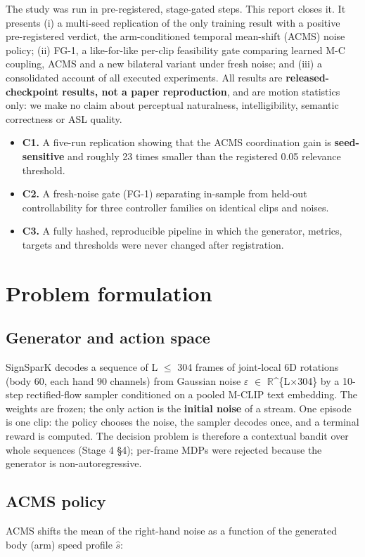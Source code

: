 \documentclass[conference]{IEEEtran}
\begin{document}
The study was run in pre-registered, stage-gated steps. This report closes it. It presents (i) a multi-seed replication of the only training result with a positive pre-registered verdict, the arm-conditioned temporal mean-shift (ACMS) noise policy; (ii) FG-1, a like-for-like per-clip feasibility gate comparing learned M-C coupling, ACMS and a new bilateral variant under fresh noise; and (iii) a consolidated account of all executed experiments. All results are \textbf{released-checkpoint results, not a paper reproduction}, and are motion statistics only: we make no claim about perceptual naturalness, intelligibility, semantic correctness or ASL quality.

\begin{itemize}\item \textbf{C1.} A five-run replication showing that the ACMS coordination gain is \textbf{seed-sensitive} and roughly 23 times smaller than the registered 0.05 relevance threshold.\item \textbf{C2.} A fresh-noise gate (FG-1) separating in-sample from held-out controllability for three controller families on identical clips and noises.\item \textbf{C3.} A fully hashed, reproducible pipeline in which the generator, metrics, targets and thresholds were never changed after registration.\end{itemize}
\section{Problem formulation}
\subsection{Generator and action space}
SignSparK decodes a sequence of L $\leq$ 304 frames of joint-local 6D rotations (body 60, each hand 90 channels) from Gaussian noise $\varepsilon$ $\in$ $\mathbb{R}$\textasciicircum{}\{L$\times$304\} by a 10-step rectified-flow sampler conditioned on a pooled M-CLIP text embedding. The weights are frozen; the only action is the \textbf{initial noise} of a stream. One episode is one clip: the policy chooses the noise, the sampler decodes once, and a terminal reward is computed. The decision problem is therefore a contextual bandit over whole sequences (Stage 4 §4); per-frame MDPs were rejected because the generator is non-autoregressive.

\subsection{ACMS policy}
ACMS shifts the mean of the right-hand noise as a function of the generated body (arm) speed profile $\hat{s}$:
\end{document}
